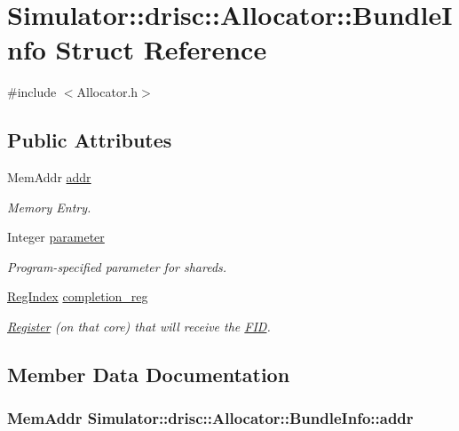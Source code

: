 \hypertarget{struct_simulator_1_1drisc_1_1_allocator_1_1_bundle_info}{\section{Simulator\+:\+:drisc\+:\+:Allocator\+:\+:Bundle\+Info Struct Reference}
\label{struct_simulator_1_1drisc_1_1_allocator_1_1_bundle_info}
}


{\ttfamily \#include $<$Allocator.\+h$>$}

\subsection*{Public Attributes}
\begin{DoxyCompactItemize}
\item 
Mem\+Addr \hyperlink{struct_simulator_1_1drisc_1_1_allocator_1_1_bundle_info_aaa2ffcc7a34c84092ebabe38bbfc5136}{addr}
\begin{DoxyCompactList}\small\item\em Memory Entry. \end{DoxyCompactList}\item 
Integer \hyperlink{struct_simulator_1_1drisc_1_1_allocator_1_1_bundle_info_a551bcce9a574f1e9731b2949046c9d5f}{parameter}
\begin{DoxyCompactList}\small\item\em Program-\/specified parameter for shareds. \end{DoxyCompactList}\item 
\hyperlink{namespace_simulator_ab00c9033de4c9a17db7b53d6c292515c}{Reg\+Index} \hyperlink{struct_simulator_1_1drisc_1_1_allocator_1_1_bundle_info_a99ab65509b8de61dd8fb113e1024c26e}{completion\+\_\+reg}
\begin{DoxyCompactList}\small\item\em \hyperlink{class_simulator_1_1_register}{Register} (on that core) that will receive the \hyperlink{struct_simulator_1_1_f_i_d}{F\+I\+D}. \end{DoxyCompactList}\end{DoxyCompactItemize}


\subsection{Member Data Documentation}
\hypertarget{struct_simulator_1_1drisc_1_1_allocator_1_1_bundle_info_aaa2ffcc7a34c84092ebabe38bbfc5136}{
\subsubsection[{addr}]{\setlength{\rightskip}{0pt plus 5cm}Mem\+Addr Simulator\+::drisc\+::\+Allocator\+::\+Bundle\+Info\+::addr}}\label{struct_simulator_1_1drisc_1_1_allocator_1_1_bundle_info_aaa2ffcc7a34c84092ebabe38bbfc5136}


